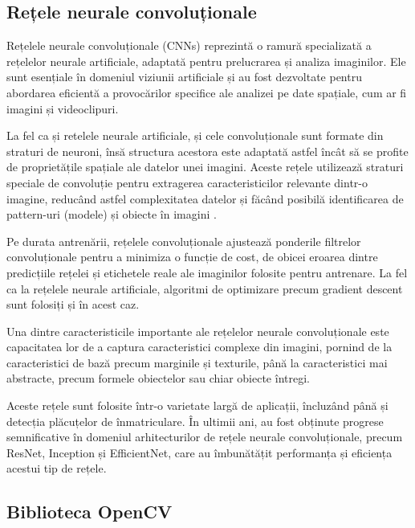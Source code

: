 \documentclass[12pt]{article}
\begin{document}
\subsection{Rețele neurale convoluționale}

Rețelele neurale convoluționale (CNNs) reprezint\u{a} o ramur\u{a} specializat\u{a} a rețelelor neurale artificiale, adaptat\u{a} pentru prelucrarea și analiza imaginilor. Ele sunt esențiale \^{i}n domeniul viziunii artificiale și au fost dezvoltate pentru abordarea eficient\u{a} a provoc\u{a}rilor specifice ale analizei pe date spațiale, cum ar fi imagini și videoclipuri.

La fel ca și retelele neurale artificiale, și cele convoluționale sunt formate din straturi de neuroni, \^{i}ns\u{a} structura acestora este adaptat\u{a} astfel \^{i}nc\^{a}t s\u{a} se profite de propriet\u{a}țile spațiale ale datelor unei imagini. Aceste rețele utilizeaz\u{a} straturi speciale de convoluție pentru extragerea caracteristicilor relevante dintr-o imagine, reduc\^{a}nd astfel complexitatea datelor și f\u{a}c\^{a}nd posibil\u{a} identificarea de pattern-uri (modele) și obiecte \^{i}n imagini \cite{cnn}.

Pe durata antren\u{a}rii, rețelele convoluționale ajusteaz\u{a} ponderile filtrelor convoluționale pentru a minimiza o funcție de cost, de obicei eroarea dintre predicțiile rețelei și etichetele reale ale imaginilor folosite pentru antrenare. La fel ca la rețelele neurale artificiale, algoritmi de optimizare precum gradient descent sunt folosiți și \^{i}n acest caz.

Una dintre caracteristicile importante ale rețelelor neurale convoluționale este capacitatea lor de a captura caracteristici complexe din imagini, pornind de la caracteristici de baz\u{a} precum marginile și texturile, p\^{a}n\u{a} la caracteristici mai abstracte, precum formele obiectelor sau chiar obiecte \^{i}ntregi.

Aceste rețele sunt folosite \^{i}ntr-o varietate larg\u{a} de aplicații, \^{i}ncluz\^{a}nd p\^{a}n\u{a} și detecția pl\u{a}cuțelor de \^{i}nmatriculare. \^{I}n ultimii ani, au fost obținute progrese semnificative \^{i}n domeniul arhitecturilor de rețele neurale convoluționale, precum ResNet, Inception și EfficientNet, care au \^{i}mbun\u{a}t\u{a}țit performanța și eficiența acestui tip de rețele.

\subsection{Biblioteca OpenCV}
\end{document}

